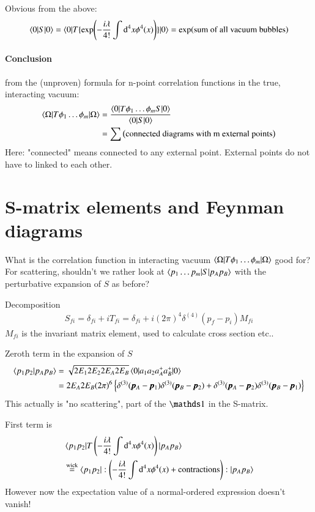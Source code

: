 Obvious from the above:
\begin{align*}
	\braket{0 | S | 0} = \braket{0 | T \{\exp(-\frac{i\lambda}{4!}\int \dd^4 x \phi^4(x))\}|0} = \exp(\text{sum of all vacuum bubbles})
\end{align*}

\paragraph{Conclusion} from the (unproven) formula for n-point correlation functions in the true, interacting vacuum:
\begin{align}
	\braket{\Omega | T \phi_1 \dots \phi_m | \Omega} &= \frac{ \braket{0 | T \phi_1 \dots \phi_m S |0}  }{ \braket{0 | S | 0}} \\
													 &= \sum \left( \text{connected diagrams with m external points} \right)
\end{align}
Here: "connected" means connected to any external point. External points do not have to linked to each other.

\section{S-matrix elements and Feynman diagrams}
What is the correlation function in interacting vacuum $\braket{\Omega| T {\phi_1\dots\phi_m} | \Omega}$ good for? For scattering, shouldn't we rather look at $\braket{p_1 \dots p_m | S | p_A p_B}$
with the perturbative expansion of $S$ as before?

Decomposition 
\begin{align}
	S_{fi} = \delta_{fi} + i T_{fi} = \delta_{fi} + i(2\pi)^4 \delta^{(4)} (p_f-p_i)M_{fi}
\end{align}
$M_{fi}$ is the invariant matrix element, used to calculate cross section etc..

Zeroth term in the expansion of $S$
\begin{align*}
	\braket{ p_1 p_2 | p_A p_B} &= \sqrt{2E_1 2E_2 2E_A 2E_B} \braket{0 | a_1 a_2 a^+_A a^+_B | 0} \\
								&= 2E_A 2E_B (2\pi)^6 \left\{ \delta^{(3)}(\pmb{p}_A-\pmb{p}_1) \delta^{(3)}(\pmb{p}_B - \pmb{p}_2) +   \delta^{(3)}(\pmb{p}_A-\pmb{p}_2) \delta^{(3)}(\pmb{p}_B - \pmb{p}_1)\right\}
\end{align*}
This actually is "no scattering", part of the $\id$ in the S-matrix.

First term is 
\begin{align*}
	&\braket{p_1 p_2 | T \left( -\frac{i\lambda}{4!} \int \dd^4 x \phi^4(x) \right)|p_A p_B } \\
	&\stackrel{\text{wick}}{=} \braket{p_1 p_2 | :\left( -\frac{i\lambda}{4!} \int \dd^4 x \phi^4(x) + \text{contractions}\right ):|p_A p_B }
\end{align*}
However now the expectation value of a normal-ordered expression doesn't vanish!

